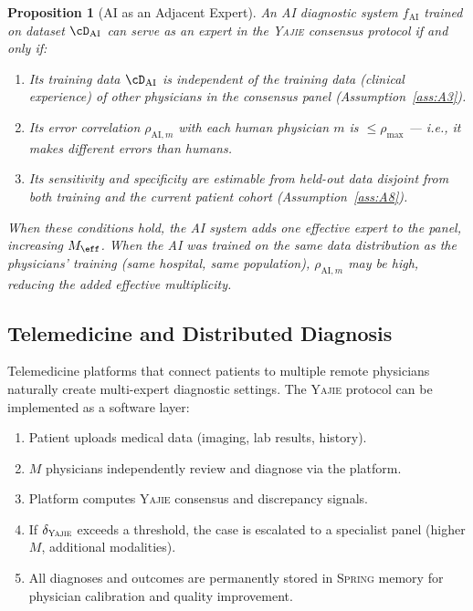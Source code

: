 \documentclass[11pt,a4paper]{article}
\newtheorem{proposition}[theorem]{Proposition}
\theoremstyle{definition}
\newcommand{\Yajie}{\textsc{Yajie}}
\newcommand{\Spring}{\textsc{Spring}}
\begin{document}
\begin{proposition}[AI as an Adjacent Expert]
\label{prop:AI_expert}
An AI diagnostic system $f_{\text{AI}}$ trained on dataset $\cD_{\text{AI}}$
can serve as an expert in the \Yajie{} consensus protocol if and only if:
\begin{enumerate}[nosep]
    \item Its training data $\cD_{\text{AI}}$ is independent of the training
    data (clinical experience) of other physicians in the consensus panel
    (Assumption~\ref{ass:A3}).
    \item Its error correlation $\rho_{\text{AI}, m}$ with each human physician
    $m$ is $\le \rho_{\max}$ --- i.e., it makes different errors than humans.
    \item Its sensitivity and specificity are estimable from held-out data
    disjoint from both training and the current patient cohort
    (Assumption~\ref{ass:A8}).
\end{enumerate}

When these conditions hold, the AI system adds one effective expert to the
panel, increasing $M_{\eff}$. When the AI was trained on the same data
distribution as the physicians' training (same hospital, same population),
$\rho_{\text{AI}, m}$ may be high, reducing the added effective multiplicity.
\end{proposition}

\subsection{Telemedicine and Distributed Diagnosis}

Telemedicine platforms that connect patients to multiple remote physicians
naturally create multi-expert diagnostic settings. The \Yajie{} protocol
can be implemented as a software layer:
\begin{enumerate}[nosep]
    \item Patient uploads medical data (imaging, lab results, history).
    \item $M$ physicians independently review and diagnose via the platform.
    \item Platform computes \Yajie{} consensus and discrepancy signals.
    \item If $\delta_{\Yajie}$ exceeds a threshold, the case is escalated to
    a specialist panel (higher $M$, additional modalities).
    \item All diagnoses and outcomes are permanently stored in \Spring{} memory
    for physician calibration and quality improvement.
\end{enumerate}
\end{document}
